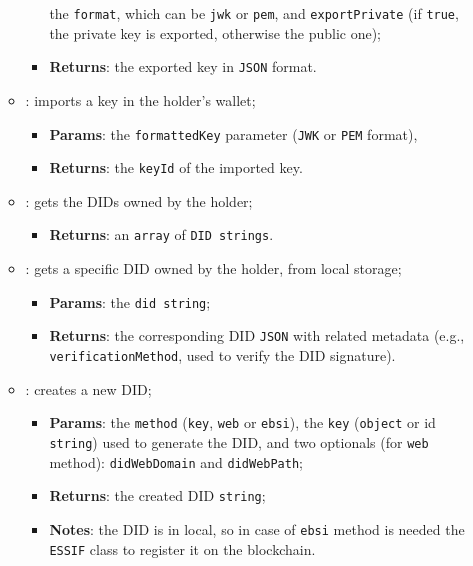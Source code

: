 \begin{itemize}
\begin{itemize}
\begin{itemize}
            the \texttt{format}, which can be \texttt{\acrshort{jwk}} or \texttt{\acrshort{pem}}, and \texttt{exportPrivate}
            (if \texttt{true}, the private key is exported, otherwise the public one);
            \item \textbf{Returns}: the exported key in \texttt{JSON} format.
        \end{itemize}
        \item[] : imports a key in the holder's wallet;
        \begin{itemize}
            \item \textbf{Params}: the \texttt{formattedKey} parameter (\texttt{JWK} or \texttt{PEM} format),
            \item \textbf{Returns}: the \texttt{keyId} of the imported key.
        \end{itemize}
        \item[] : gets the DIDs owned by the holder;
        \begin{itemize}
            \item \textbf{Returns}: an \texttt{array} of \texttt{DID strings}.
        \end{itemize}
        \item[] : gets a specific DID owned by the holder, from local storage;
        \begin{itemize}
            \item \textbf{Params}: the \texttt{did string};
            \item \textbf{Returns}: the corresponding DID \texttt{JSON} with related metadata
            (e.g., \texttt{verificationMethod}, used to verify the DID signature).
        \end{itemize}
        \item[] : creates a new DID;
        \begin{itemize}
            \item \textbf{Params}: the \texttt{method} (\texttt{key}, \texttt{web} or \texttt{ebsi}),
            the \texttt{key} (\texttt{object} or id \texttt{string}) used to generate the DID, and
            two optionals (for \texttt{web} method): \texttt{didWebDomain} and \texttt{didWebPath};
            \item \textbf{Returns}: the created DID \texttt{string};
            \item \textbf{Notes}: the DID is in local, so in case of \texttt{ebsi} method
            is needed the \texttt{ESSIF} class to register it on the blockchain.

\end{itemize}
\end{itemize}
\end{itemize}
